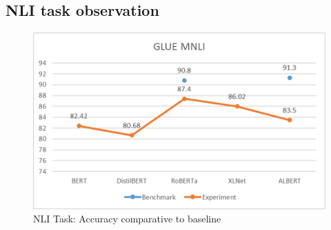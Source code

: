 \documentclass{article}
\begin{document}
    



    


\subsection{NLI task observation}

\begin{figure}[h]
\centering
\includegraphics[width=0.8\columnwidth]{Picture2.png}
\caption{{NLI Task: Accuracy comparative to baseline}}
\label{fig:lossimages}
\vspace{-1pt}
\end{figure}
\end{document}
